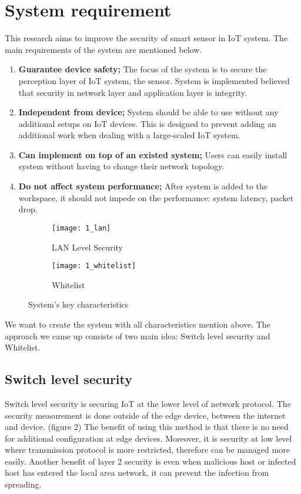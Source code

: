 \section{System requirement}
This research aims to improve the security of smart sensor in IoT system. The main requirements of the system are mentioned below. 

\begin{enumerate}
    \item \textbf{Guarantee device safety;} The focus of the system is to secure the perception layer of IoT system, the sensor. System is implemented believed that security in network layer and application layer is integrity.  
    \item \textbf{Independent from device;} System should be able to use without any additional setups on IoT devices. This is designed to prevent adding an additional work when dealing with a large-scaled IoT system.    
    \item \textbf{Can implement on top of an existed system;} Users can easily install system without having to change their network topology.
    \item \textbf{Do not affect system performance;} After system is added to the workspace, it should not impede on the performance: system latency, packet drop.
\end{enumerate}

\begin{figure}
    \centering
    \begin{subfigure}[b]{0.4\textwidth}
        \centering
        \texttt{[image: 1\_lan]}
        \caption{LAN Level Security}
        \label{fig:s3_lan}
    \end{subfigure}
    \hspace{1.5cm}
    \begin{subfigure}[b]{0.4\textwidth}
        \centering
        \texttt{[image: 1\_whitelist]}
        \caption{Whitelist}
        \label{fig:s3_whitelist}
    \end{subfigure} 
    \caption{System's key characteristics}
    \label{fig:s3_system_characteristics}
\end{figure}




We want to create the system with all characteristics mention above. The approach we came up consists of two main idea: Switch level security and Whitelist. 

\subsection{Switch level security}
Switch level security is securing IoT at the lower level of network protocol. The security measurement is done outside of the edge device, between the internet and device. (figure 2) The benefit of using this method is that there is no need for additional configuration at edge devices. Moreover, it is security at low level where transmission protocol is more restricted, therefore can be managed more easily. Another benefit of layer 2 security is even when malicious host or infected host has entered the local area network, it can prevent the infection from spreading. 

